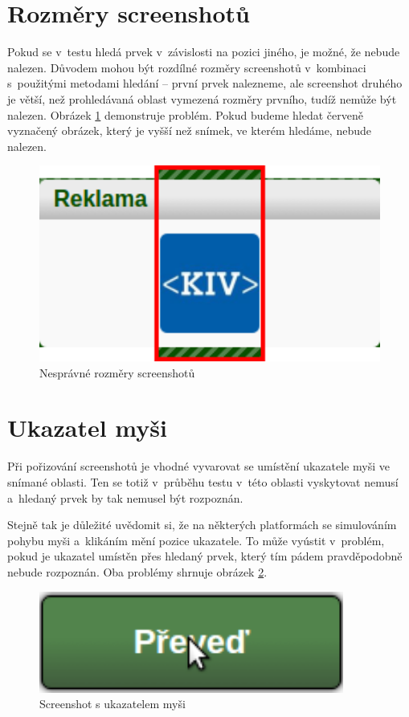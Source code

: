 	\section{Rozměry screenshotů}
	Pokud se v~testu hledá prvek v~závislosti na pozici jiného, je možné, že nebude nalezen. Důvodem mohou být rozdílné rozměry screenshotů v~kombinaci s~použitými metodami hledání -- první prvek nalezneme, ale screenshot druhého je větší, než prohledávaná oblast vymezená rozměry prvního, tudíž nemůže být nalezen. Obrázek \ref{rozmery} demonstruje problém. Pokud budeme hledat červeně vyznačený obrázek, který je vyšší než snímek, ve kterém hledáme, nebude nalezen.
	
	\begin{figure}[ht!]
		\centering
		\caption{Nesprávné rozměry screenshotů}
		\label{rozmery}
		\includegraphics[width=12.5cm]{img/Chyby/reklama.png}
	\end{figure}
	
	\section{Ukazatel myši}
	Při pořizování screenshotů je vhodné vyvarovat se umístění ukazatele myši ve snímané oblasti. Ten se totiž v~průběhu testu v~této oblasti vyskytovat nemusí a~hledaný prvek by tak nemusel být rozpoznán.
	
	Stejně tak je důležité uvědomit si, že na některých platformách se simulováním pohybu myši a~klikáním mění pozice ukazatele. To může vyústit v~problém, pokud je ukazatel umístěn přes hledaný prvek, který tím pádem pravděpodobně nebude rozpoznán. Oba problémy shrnuje obrázek \ref{mys}.
	
	\begin{figure}[ht!]
		\centering
		\caption{Screenshot s ukazatelem myši}
		\label{mys}
		\includegraphics[width=10cm]{img/Chyby/mys.png}
	\end{figure}
	
